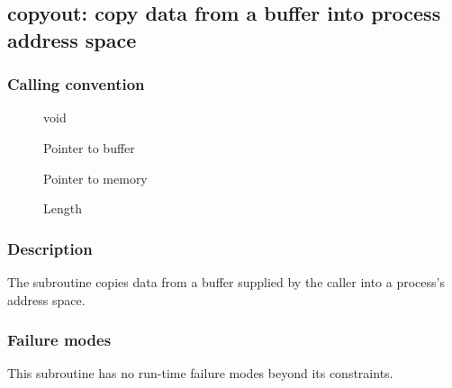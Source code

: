 \clearpage
{}
{}
\label{subr:copyout}
\subsection*{copyout: copy data from a buffer into process address space}

\subsubsection*{Calling convention}

\begin{description}
\item[] void
\item[] Pointer to buffer
\item[] Pointer to memory
\item[] Length
\end{description}

\subsubsection*{Description}

The  subroutine copies data from a buffer supplied
by the caller into a process's address space.

\subsubsection*{Failure modes}

This subroutine has no run-time failure modes beyond its constraints.
